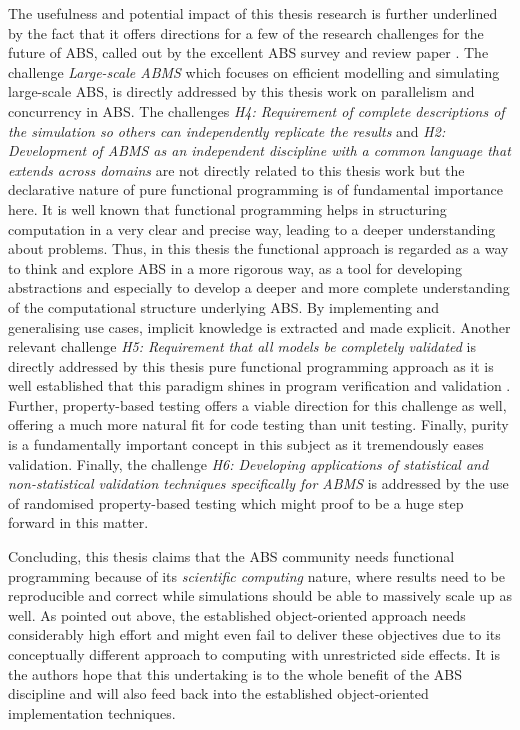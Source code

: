 The usefulness and potential impact of this thesis research is further underlined by the fact that it offers directions for a few of the research challenges for the future of ABS, called out by the excellent ABS survey and review paper \cite{macal_everything_2016}. The challenge \textit{Large-scale ABMS} which focuses on efficient modelling and simulating large-scale ABS, is directly addressed by this thesis work on parallelism and concurrency in ABS. The challenges \emph{H4: Requirement of complete descriptions of the simulation so others can independently replicate the results} and \emph{H2: Development of ABMS as an independent discipline with a common language that extends across domains} are not directly related to this thesis work but the declarative nature of pure functional programming is of fundamental importance here. It is well known that functional programming helps in structuring computation in a very clear and precise way, leading to a deeper understanding about problems. Thus, in this thesis the functional approach is regarded as a way to think and explore ABS in a more rigorous way, as a tool for developing abstractions and especially to develop a deeper and more complete understanding of the computational structure underlying ABS. By implementing and generalising use cases, implicit knowledge is extracted and made explicit. Another relevant challenge \emph{H5: Requirement that all models be completely validated} is directly addressed by this thesis pure functional programming approach as it is well established that this paradigm shines in program verification and validation \cite{hudak_history_2007, hutton_tutorial_1999}. Further, property-based testing offers a viable direction for this challenge as well, offering a much more natural fit for code testing than unit testing. Finally, purity is a fundamentally important concept in this subject as it tremendously eases validation. Finally, the challenge \emph{H6: Developing applications of statistical and non-statistical validation techniques specifically for ABMS} is addressed by the use of randomised property-based testing which might proof to be a huge step forward in this matter.

\medskip

Concluding, this thesis claims that the ABS community needs functional programming because of its \textit{scientific computing} nature, where results need to be reproducible and correct while simulations should be able to massively scale up as well. As pointed out above, the established object-oriented approach needs considerably high effort and might even fail to deliver these objectives due to its conceptually different approach to computing with unrestricted side effects. It is the authors hope that this undertaking is to the whole benefit of the ABS discipline and will also feed back into the established object-oriented implementation techniques.


